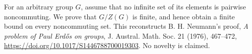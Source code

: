 For an arbitrary group $G$, assume that no infinite set of its elements is pairwise noncommuting. We prove that $G/Z(G)$ is finite, and hence obtain a finite bound on every noncommuting set. This reconstructs B. H. Neumann's proof, \emph{A problem of Paul Erd\H{o}s on groups}, J. Austral. Math. Soc. 21 (1976), 467--472, \url{https://doi.org/10.1017/S1446788700019303}. No novelty is claimed.

